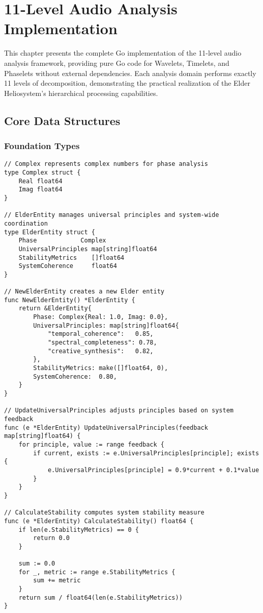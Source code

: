 \chapter{11-Level Audio Analysis Implementation}

\begin{tcolorbox}[colback=DarkSkyBlue!5!white,colframe=DarkSkyBlue!75!black,title=Chapter Overview]
This chapter presents the complete Go implementation of the 11-level audio analysis framework, providing pure Go code for Wavelets, Timelets, and Phaselets without external dependencies. Each analysis domain performs exactly 11 levels of decomposition, demonstrating the practical realization of the Elder Heliosystem's hierarchical processing capabilities.
\end{tcolorbox}

\section{Core Data Structures}

\subsection{Foundation Types}

\begin{tcolorbox}[colback=CodeBackground, colframe=DarkGray, title=Core Data Types, fonttitle=\bfseries]
\begin{verbatim}
// Complex represents complex numbers for phase analysis
type Complex struct {
    Real float64
    Imag float64
}

// ElderEntity manages universal principles and system-wide coordination
type ElderEntity struct {
    Phase            Complex
    UniversalPrinciples map[string]float64
    StabilityMetrics    []float64
    SystemCoherence     float64
}

// NewElderEntity creates a new Elder entity
func NewElderEntity() *ElderEntity {
    return &ElderEntity{
        Phase: Complex{Real: 1.0, Imag: 0.0},
        UniversalPrinciples: map[string]float64{
            "temporal_coherence":   0.85,
            "spectral_completeness": 0.78,
            "creative_synthesis":   0.82,
        },
        StabilityMetrics: make([]float64, 0),
        SystemCoherence:  0.80,
    }
}

// UpdateUniversalPrinciples adjusts principles based on system feedback
func (e *ElderEntity) UpdateUniversalPrinciples(feedback map[string]float64) {
    for principle, value := range feedback {
        if current, exists := e.UniversalPrinciples[principle]; exists {
            e.UniversalPrinciples[principle] = 0.9*current + 0.1*value
        }
    }
}

// CalculateStability computes system stability measure
func (e *ElderEntity) CalculateStability() float64 {
    if len(e.StabilityMetrics) == 0 {
        return 0.0
    }
    
    sum := 0.0
    for _, metric := range e.StabilityMetrics {
        sum += metric
    }
    return sum / float64(len(e.StabilityMetrics))
}
\end{verbatim}
\end{tcolorbox}

